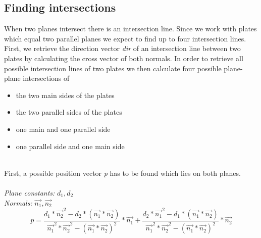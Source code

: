 \documentclass[../ClassicThesis.tex]{subfiles}
\begin{document}
\subsection{Finding intersections}\label{findIntersections}
When two planes intersect there is an intersection line. Since we work with plates which equal two parallel planes we expect to find up to four intersection lines.\\
First, we retrieve the direction vector \emph{dir} of an intersection line between two plates by calculating the cross vector of both normals.
In order to retrieve all possible intersection lines of two plates we then calculate four possible plane-plane intersections \cite{planePlaneIntersection} of 
\begin{itemize}
\item the two main sides of the plates
\item the two parallel sides of the plates
\item one main and one parallel side 
\item one parallel side and one main side
\end{itemize}
\*\\
First, a possible position vector \emph{p} has to be found which lies on both planes.
\\\*\\
\emph{Plane constants:} $d_1, d_2$\\
\emph{Normals:} $\vec{n_1}, \vec{n_2}$
$$ p = \frac{d_1 * \vec{n_{2}}^{2} - d_2 * (\vec{n_1} * \vec{n_2})}{\vec{n_{1}}^{2} * \vec{n_{2}}^{2} - (\vec{n_1} * \vec{n_2})^{2}} * \vec{n_1} + \frac{d_2*\vec{n_1}^2 - d_1*(\vec{n_1} * \vec{n_2})}{\vec{n_1}^2 * \vec{n_2}^2 - (\vec{n_1} * \vec{n_2})^2} * \vec{n_2} $$
\end{document}
